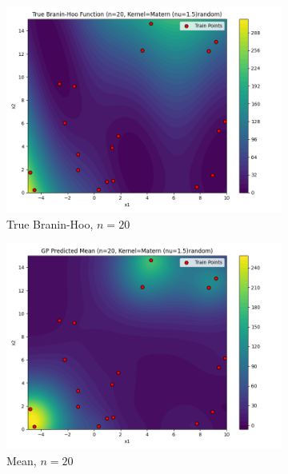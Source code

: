 \documentclass[a4paper,12pt]{article}
\begin{document}
\begin{figure}[H]
\begin{subfigure}{0.3\textwidth}
  \includegraphics[width=\linewidth]{Task-02/images/true_function_matern_n20_random.png}
  \caption{True Branin-Hoo, $n=20$}
\end{subfigure}
\begin{subfigure}{0.3\textwidth}
    \includegraphics[width=\linewidth]{Task-02/images/gp_mean_matern_n20_random.png}
    \caption{Mean, $n=20$}
\end{subfigure}
\begin{subfigure}{0.3\textwidth}

\end{subfigure}
\end{figure}
\end{document}
